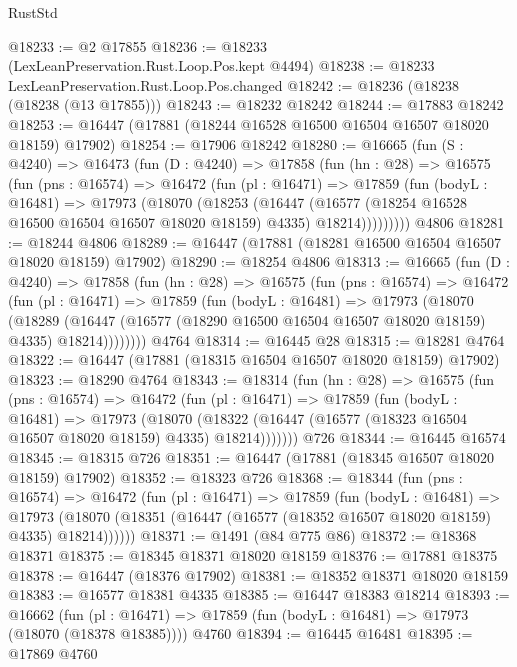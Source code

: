 \begin{lexlean}{RustStd}
\begin{coremodule}
{\begin{coremodule}
{{{{{{{{{{{{{{{{{{{{{{{{{{{{{{{{{{{{{{{{{{{{{{{{{{{{{{{@18233 := @2 @17855
@18236 := @18233 (LexLeanPreservation.Rust.Loop.Pos.kept @4494)
@18238 := @18233 LexLeanPreservation.Rust.Loop.Pos.changed
@18242 := @18236 (@18238 (@18238 (@13 @17855)))
@18243 := @18232 @18242
@18244 := @17883 @18242
@18253 := @16447 (@17881 (@18244 @16528 @16500 @16504 @16507 @18020 @18159) @17902)
@18254 := @17906 @18242
@18280 := @16665
    (fun (S : @4240) =>
    @16473
      (fun (D : @4240) =>
      @17858
        (fun (hn : @28) =>
        @16575
          (fun (pns : @16574) =>
          @16472
            (fun (pl : @16471) =>
            @17859
              (fun (bodyL : @16481) =>
              @17973
                (@18070
                  (@18253
                    (@16447
                      (@16577 (@18254 @16528 @16500 @16504 @16507 @18020 @18159) @4335)
                      @18214)))))))))
    @4806
@18281 := @18244 @4806
@18289 := @16447 (@17881 (@18281 @16500 @16504 @16507 @18020 @18159) @17902)
@18290 := @18254 @4806
@18313 := @16665
    (fun (D : @4240) =>
    @17858
      (fun (hn : @28) =>
      @16575
        (fun (pns : @16574) =>
        @16472
          (fun (pl : @16471) =>
          @17859
            (fun (bodyL : @16481) =>
            @17973
              (@18070
                (@18289
                  (@16447 (@16577 (@18290 @16500 @16504 @16507 @18020 @18159) @4335) @18214))))))))
    @4764
@18314 := @16445 @28
@18315 := @18281 @4764
@18322 := @16447 (@17881 (@18315 @16504 @16507 @18020 @18159) @17902)
@18323 := @18290 @4764
@18343 := @18314
    (fun (hn : @28) =>
    @16575
      (fun (pns : @16574) =>
      @16472
        (fun (pl : @16471) =>
        @17859
          (fun (bodyL : @16481) =>
          @17973
            (@18070
              (@18322 (@16447 (@16577 (@18323 @16504 @16507 @18020 @18159) @4335) @18214)))))))
    @726
@18344 := @16445 @16574
@18345 := @18315 @726
@18351 := @16447 (@17881 (@18345 @16507 @18020 @18159) @17902)
@18352 := @18323 @726
@18368 := @18344
    (fun (pns : @16574) =>
    @16472
      (fun (pl : @16471) =>
      @17859
        (fun (bodyL : @16481) =>
        @17973 (@18070 (@18351 (@16447 (@16577 (@18352 @16507 @18020 @18159) @4335) @18214))))))
@18371 := @1491 (@84 @775 @86)
@18372 := @18368 @18371
@18375 := @18345 @18371 @18020 @18159
@18376 := @17881 @18375
@18378 := @16447 (@18376 @17902)
@18381 := @18352 @18371 @18020 @18159
@18383 := @16577 @18381 @4335
@18385 := @16447 @18383 @18214
@18393 := @16662
    (fun (pl : @16471) => @17859 (fun (bodyL : @16481) => @17973 (@18070 (@18378 @18385))))
    @4760
@18394 := @16445 @16481
@18395 := @17869 @4760
}}}}}}}}}}}}}}}}}}}}}}}}}}}}}}}}}}}}}}}}}}}}}}}}}}}}}}}
\end{coremodule}}
\end{coremodule}
\end{lexlean}
